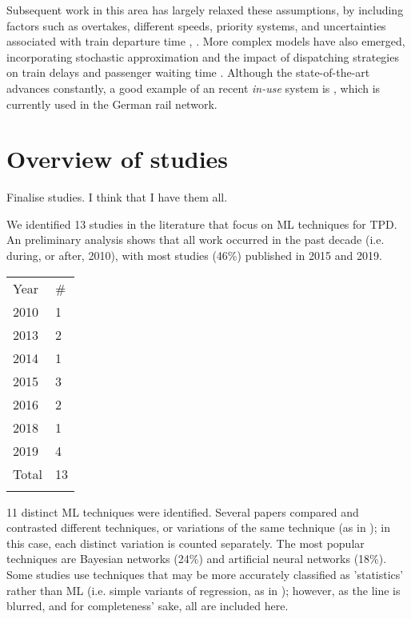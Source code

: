 \documentclass{article}
\begin{document}
Subsequent work in this area has largely relaxed these assumptions, by including factors such as overtakes, different speeds, priority systems, and uncertainties associated with train departure time \cite{petersen_1974}, \cite{chen_harker_1990}. More complex models have also emerged, incorporating stochastic approximation \cite{carey_kwiecinski_1994} and the impact of dispatching strategies on train delays
and passenger waiting time \cite{ozekici_sengor_1994}. Although the state-of-the-art advances constantly, a good example of an recent \textit{in-use} system is \cite{berger_et_al_2011}, which is currently used in the German rail network.




\clearpage
\section{Overview of studies}

Finalise studies. I think that I have them all. 

We identified 13 studies in the literature that focus on ML techniques for TPD. An preliminary analysis shows that all work occurred in the past decade (i.e. during, or after, 2010), with most studies (46\%) published
in 2015 and 2019.

\begin{table}[h]
\centering
\begin{tabular}{ll}
\noalign{\smallskip}\hline \noalign{\smallskip}
Year  & \# \\	\noalign{\smallskip}\hline \noalign{\smallskip}
2010  & 1  \\
2013  & 2  \\
2014  & 1  \\
2015  & 3  \\
2016  & 2  \\
2018  & 1  \\
2019  & 4  \\ 	\noalign{\smallskip}
Total & 13 \\  \noalign{\smallskip}\hline
\end{tabular}
\end{table}

11 distinct ML techniques were identified. Several papers compared and contrasted different techniques, or variations of the same technique (as in \cite{lessan_fu_wen_2019}\cite{oneto_fumeo_clerico_canepa_papa_dambra_mazzino_anguita_2016}\cite{milinkovic_markovic_veskovic_ivic_pavlovic_2013}\cite{markovic_milinkovic_tikhonov_schonfeld_2015}); in this case, each distinct variation is counted separately. The most popular techniques are Bayesian networks (24\%) and artificial neural networks (18\%). Some studies use techniques that may be more accurately classified as 'statistics' rather than ML (i.e. simple variants of regression, as in \cite{pongnumkul_pechprasarn_kunaseth_chaipah_2014}\cite{wang_work_2015}); however, as the line is blurred, and for completeness' sake, all are included here.
\end{document}
